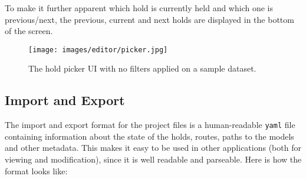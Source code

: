 To make it further apparent which hold is currently held and which one is previous/next, the previous, current and next holds are displayed in the bottom of the screen.

\begin{figure}[h]
	\centering
	\texttt{[image: images/editor/picker.jpg]}%
	\caption{The hold picker UI with no filters applied on a sample dataset.}%
	\label{fig:picker}
\end{figure}

\subsection{Import and Export}
The import and export format for the project files is a human-readable \verb|yaml| file containing information about the state of the holds, routes, paths to the models and other metadata.
This makes it easy to be used in other applications (both for viewing and modification), since it is well readable and parseable.
Here is how the format looks like:

